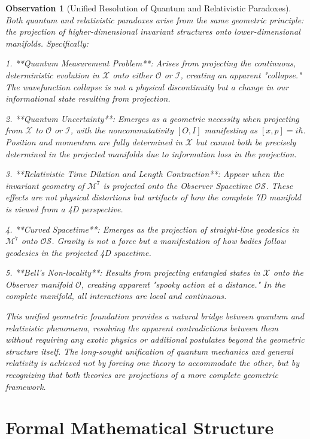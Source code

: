\documentclass{article}
\newtheorem{observation}{Observation}
\begin{document}
\begin{observation}[Unified Resolution of Quantum and Relativistic Paradoxes]
Both quantum and relativistic paradoxes arise from the same geometric principle: the projection of higher-dimensional invariant structures onto lower-dimensional manifolds. Specifically:

1. **Quantum Measurement Problem**: Arises from projecting the continuous, deterministic evolution in $\mathcal{X}$ onto either $\mathcal{O}$ or $\mathcal{I}$, creating an apparent "collapse." The wavefunction collapse is not a physical discontinuity but a change in our informational state resulting from projection.

2. **Quantum Uncertainty**: Emerges as a geometric necessity when projecting from $\mathcal{X}$ to $\mathcal{O}$ or $\mathcal{I}$, with the noncommutativity $[O, I]$ manifesting as $[x, p] = i\hbar$. Position and momentum are fully determined in $\mathcal{X}$ but cannot both be precisely determined in the projected manifolds due to information loss in the projection.

3. **Relativistic Time Dilation and Length Contraction**: Appear when the invariant geometry of $\mathcal{M}^7$ is projected onto the Observer Spacetime $\mathcal{OS}$. These effects are not physical distortions but artifacts of how the complete 7D manifold is viewed from a 4D perspective.

4. **Curved Spacetime**: Emerges as the projection of straight-line geodesics in $\mathcal{M}^7$ onto $\mathcal{OS}$. Gravity is not a force but a manifestation of how bodies follow geodesics in the projected 4D spacetime.

5. **Bell's Non-locality**: Results from projecting entangled states in $\mathcal{X}$ onto the Observer manifold $\mathcal{O}$, creating apparent "spooky action at a distance." In the complete manifold, all interactions are local and continuous.

This unified geometric foundation provides a natural bridge between quantum and relativistic phenomena, resolving the apparent contradictions between them without requiring any exotic physics or additional postulates beyond the geometric structure itself. The long-sought unification of quantum mechanics and general relativity is achieved not by forcing one theory to accommodate the other, but by recognizing that both theories are projections of a more complete geometric framework.
\end{observation}

\section{Formal Mathematical Structure}
\end{document}
